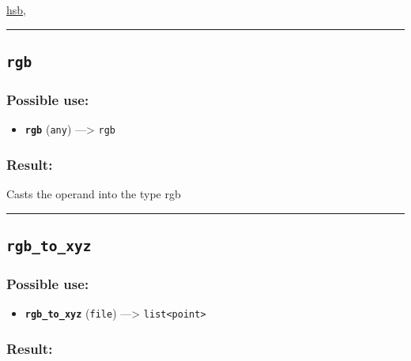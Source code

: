 \documentclass[]{book}
\providecommand{\tightlist}{%
  \setlength{\itemsep}{0pt}\setlength{\parskip}{0pt}}
\theoremstyle{definition}
\theoremstyle{definition}
\theoremstyle{definition}
\theoremstyle{remark}
\begin{document}
\href{OperatorsDH\#hsb}{hsb},

\begin{center}\rule{0.5\linewidth}{\linethickness}\end{center}

\subsection{\texorpdfstring{\texttt{rgb}}{rgb}}\label{rgb-1}

\subsubsection{Possible use:}\label{possible-use-438}

\begin{itemize}
\tightlist
\item
  \textbf{\texttt{rgb}} (\texttt{any}) ---\textgreater{} \texttt{rgb}
\end{itemize}

\subsubsection{Result:}\label{result-424}

Casts the operand into the type rgb

\begin{center}\rule{0.5\linewidth}{\linethickness}\end{center}

\subsection{\texorpdfstring{\texttt{rgb\_to\_xyz}}{rgb\_to\_xyz}}\label{rgb_to_xyz}

\subsubsection{Possible use:}\label{possible-use-439}

\begin{itemize}
\tightlist
\item
  \textbf{\texttt{rgb\_to\_xyz}} (\texttt{file}) ---\textgreater{}
  \texttt{list\textless{}point\textgreater{}}
\end{itemize}

\subsubsection{Result:}\label{result-425}
\end{document}
